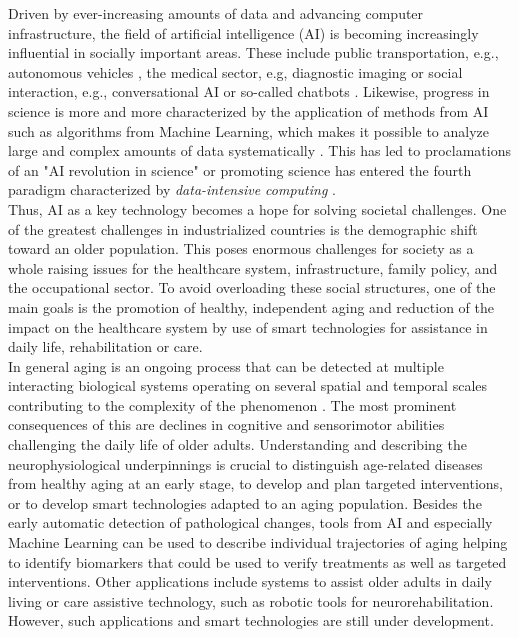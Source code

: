 Driven by ever-increasing amounts of data and advancing computer infrastructure, the field of artificial intelligence (AI) is becoming increasingly influential in socially important areas. These include public transportation, e.g., autonomous vehicles \cite{Leonard2020}, the medical sector, e.g, diagnostic imaging \cite{Liu2020} or social interaction, e.g., conversational AI or so-called chatbots \cite{Adamopoulou2020}. Likewise, progress in science is more and more characterized by the application of methods from AI such as algorithms from Machine Learning, which makes it possible to analyze large and complex amounts of data systematically \cite{Brunton2019}. This has led to proclamations of an "AI revolution in science" \cite{Appenzeller2017} or promoting science has entered the fourth paradigm characterized by \textit{data-intensive computing} \cite{Hey2009}.\\
Thus, AI as a key technology becomes a hope for solving societal challenges. One of the greatest challenges in industrialized countries is the demographic shift toward an older population. This poses enormous challenges for society as a whole raising issues for the healthcare system, infrastructure, family policy, and the occupational sector. To avoid overloading these social structures, one of the main goals is the promotion of healthy, independent aging and reduction of the impact on the healthcare system by use of smart technologies for assistance in daily life, rehabilitation or care.\\ 
In general aging is an ongoing process that can be detected at multiple interacting biological systems operating on several spatial and temporal scales contributing to the complexity of the phenomenon \cite{Mooney2016}. The most prominent consequences of this are declines in cognitive and sensorimotor abilities challenging the daily life of older adults. Understanding and describing the neurophysiological underpinnings is crucial to distinguish age-related diseases from healthy aging at an early stage, to develop and plan targeted interventions, or to develop smart technologies adapted to an aging population. Besides the early automatic detection of pathological changes, tools from AI and especially Machine Learning can be used to describe individual trajectories of aging helping to identify biomarkers that could be used to verify treatments as well as targeted interventions. Other applications include systems to assist older adults in daily living or care assistive technology, such as robotic tools for neurorehabilitation. However, such applications and smart technologies are still under development.\\
